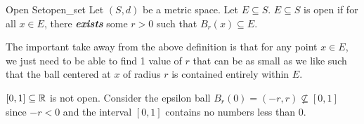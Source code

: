  

\begin{defn}{Open Set}{open_set}
Let \((S, d)\) be a metric space. Let \(E \subseteq S\). 
\newline
\(E \subseteq S\) is open if for all \(x \in E\), there \textbf{\textit{exists}} some \(r > 0\) such that \(B_r(x) \subseteq E\).

\end{defn}
The important take away from the above definition is that for any point \(x \in E\), we just need to be able to find 1 value of \(r\) that can be as small as we like such that the ball centered at \(x\) of radius \(r\) is contained entirely within \(E\). 
\newline

\begin{exmp}{}{}
\([0, 1] \subseteq {\mathbb R}\) is not open. Consider the epsilon ball \(B_r(0) = (-r, r) \not\subseteq [0,1]\) since \(-r < 0\) and the interval \([0, 1]\) contains no numbers less than 0.
\end{exmp}


